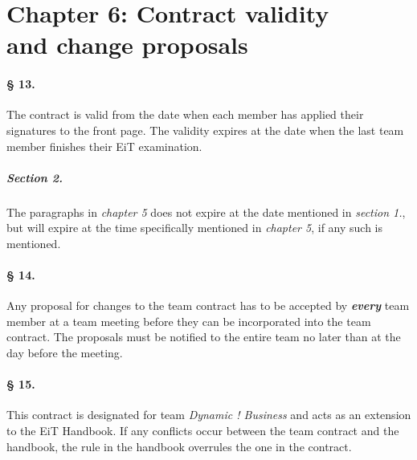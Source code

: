 \documentclass{article}
\begin{document}
\section*{Chapter 6: Contract validity \\ and change proposals}
\paragraph{§ 13.}
The contract is valid from the date when each member has applied their signatures to the front page. The validity expires at the date when the last team member finishes their EiT examination.
\subparagraph{Section 2.}
The paragraphs in \textit{chapter 5} does not expire at the date mentioned in \textit{section 1.}, but will expire at the time specifically mentioned in \emph{chapter 5}, if any such is mentioned.
\paragraph{§ 14.} \label{Change}
Any proposal for changes to the team contract has to be accepted by \textbf{\textit{every}} team member at a team meeting before they can be incorporated into the team contract. The proposals must be notified to the entire team no later than at the day before the meeting.
\paragraph{§ 15.}
This contract is designated for team \emph{Dynamic ! Business} and acts as an extension to the EiT Handbook. If any conflicts occur between the team contract and the handbook, the rule in the handbook overrules the one in the contract.


\end{document}
